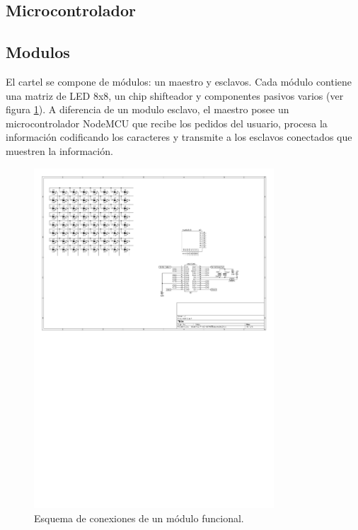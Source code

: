 \subsection{Microcontrolador}
\subsection{Modulos}
El cartel se compone de módulos: un maestro y esclavos. Cada módulo contiene una matriz de LED 8x8, un chip shifteador \cite{MAX7219} y componentes pasivos varios (ver figura \ref{fig:hw-moduloEsquematico}). A diferencia de un modulo esclavo, el maestro posee un microcontrolador NodeMCU que recibe los pedidos del usuario, procesa la información codificando los caracteres y transmite a los esclavos conectados que muestren la información.

\begin{figure}[ht!]
	\begin{center}
		\includegraphics[width=0.8\textwidth]{imagenes/hw/moduloEsquematico}
		\caption{Esquema de conexiones de un módulo funcional.}
		\label{fig:hw-moduloEsquematico}
	\end{center}
\end{figure}


